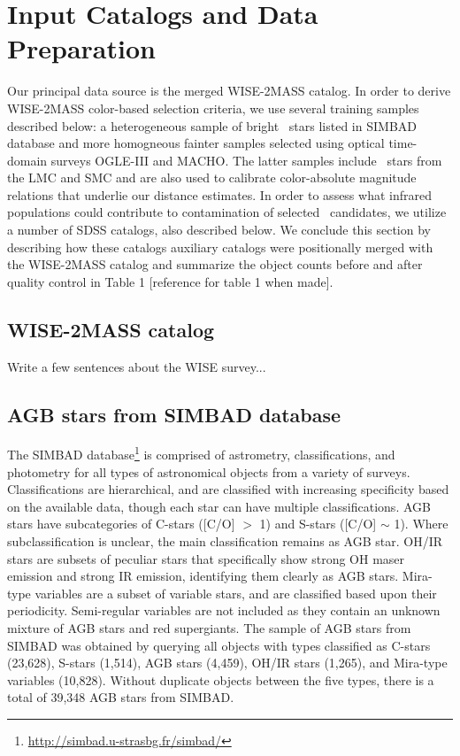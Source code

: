 \section{Input Catalogs and Data Preparation}
\label{sec:data}

Our principal data source is the merged WISE-2MASS catalog. In order to derive
WISE-2MASS color-based selection criteria, we use several training samples
described below: a heterogeneous sample of bright \agb\ stars listed in 
SIMBAD database and more homogneous fainter samples selected using 
optical time-domain surveys OGLE-III and MACHO. The latter samples 
include \agb\ stars from the LMC and SMC and are also used to 
calibrate color-absolute magnitude relations that underlie our distance
estimates. In order to assess what infrared populations could contribute to
contamination of selected \agb\ candidates, we utilize a number of SDSS
catalogs, also described below. We conclude this section by describing
how these catalogs auxiliary catalogs were  positionally merged with the 
WISE-2MASS catalog and summarize the object counts before and after quality control in Table 1 {\color{red} [reference for table 1 when made]}. 

\subsection{WISE-2MASS catalog}
Write a few sentences about the WISE survey...

\subsection{AGB stars from SIMBAD database}
The SIMBAD database\footnote{\url{http://simbad.u-strasbg.fr/simbad/}} is comprised of astrometry, classifications, and photometry for all types of astronomical objects from a variety of surveys.  Classifications are hierarchical, and are classified with increasing specificity based on the available data, though each star can have multiple classifications. AGB stars have subcategories of C-stars ([C/O] $>$ 1) and S-stars ([C/O] $\sim$ 1). Where subclassification is unclear, the main classification remains as AGB star. OH/IR stars are subsets of peculiar stars that specifically show strong OH maser emission and strong IR emission, identifying them clearly as AGB stars.  Mira-type variables are a subset of variable stars, and are classified based upon their periodicity. Semi-regular variables are not included as they contain an unknown mixture of AGB stars and red supergiants. The sample of AGB stars from SIMBAD was obtained by querying all objects with types classified as C-stars (23,628), S-stars (1,514), AGB stars (4,459), OH/IR stars (1,265), and Mira-type variables (10,828). Without duplicate objects between the five types, there is a total of 39,348 AGB stars from SIMBAD.

